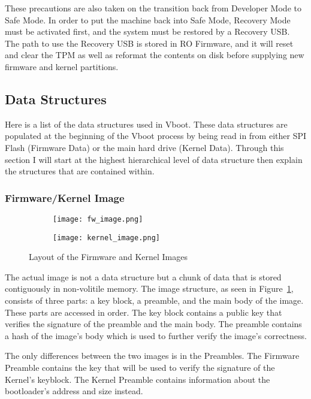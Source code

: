 These precautions are also taken on the transition back from Developer Mode to Safe Mode. 
In order to put the machine back into Safe Mode, Recovery Mode must be activated first, and the system must be restored by a Recovery USB\@.
The path to use the Recovery USB is stored in RO Firmware, and it will reset and clear the TPM as well as reformat the contents on disk before supplying new firmware and kernel partitions. 

\subsection{Data Structures}

Here is a list of the data structures used in Vboot.
These data structures are populated at the beginning of the Vboot process by being read in from either SPI Flash (Firmware Data) or the main hard drive (Kernel Data).
Through this section I will start at the highest hierarchical level of data structure then explain the structures that are contained within.

\subsubsection{Firmware/Kernel Image}

\begin{figure}
\begin{subfigure}{.5\textwidth}
  \centering
  \texttt{[image: fw\_image.png]}
\end{subfigure}%
\begin{subfigure}{.5\textwidth}
  \centering
  \texttt{[image: kernel\_image.png]}
\end{subfigure}
\caption{Layout of the Firmware and Kernel Images}
\label{fig:vboot_images}
\end{figure}

The actual image is not a data structure but a chunk of data that is stored contiguously in non-volitile memory.
The image structure, as seen in Figure~\ref{fig:vboot_images}, consists of three parts: a key block, a preamble, and the main body of the image.
These parts are accessed in order.
The key block contains a public key that verifies the signature of the preamble and the main body. 
The preamble contains a hash of the image's body which is used to further verify the image's correctness.

The only differences between the two images is in the Preambles.
The Firmware Preamble contains the key that will be used to verify the signature of the Kernel's keyblock.
The Kernel Preamble contains information about the bootloader's address and size instead.

